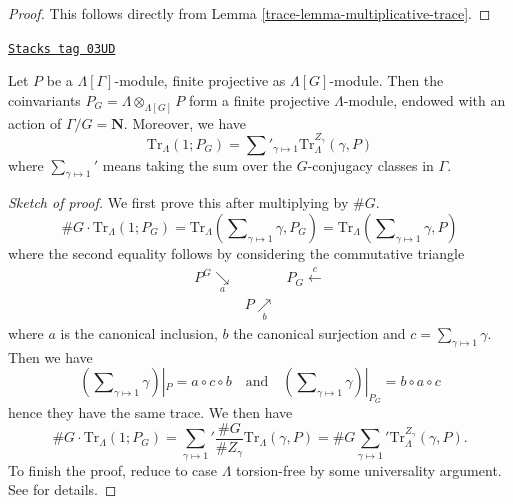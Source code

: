\begin{proof}

This follows directly from Lemma \ref{trace-lemma-multiplicative-trace}.
\end{proof}

\begin{lemma}
\label{trace-lemma-trivial-trace}
\href{https://stacks.math.columbia.edu/tag/03UD}{\texttt{Stacks tag 03UD}}

Let $P$ be a $\Lambda[\Gamma]$-module, finite projective as
$\Lambda[G]$-module. Then the coinvariants
$P_G = \Lambda \otimes_{\Lambda[G]} P$
form a finite projective $\Lambda$-module, endowed with an action of
$\Gamma/G = \mathbf{N}$. Moreover, we have
$$
\text{Tr}_\Lambda(1; P_G) =
\sum\nolimits'_{\gamma \mapsto 1} \text{Tr}_\Lambda^{Z_\gamma}(\gamma, P)
$$
where $\sum_{\gamma\mapsto 1}'$ means taking the sum over the $G$-conjugacy
classes in $\Gamma$.
\end{lemma}

\begin{proof}[Sketch of proof]
We first prove this after multiplying by $\# G$.
$$
\# G\cdot \text{Tr}_\Lambda(1; P_G)
= \text{Tr}_\Lambda(\sum\nolimits_{\gamma\mapsto 1} \gamma, P_G)
= \text{Tr}_\Lambda(\sum\nolimits_{\gamma\mapsto 1} \gamma, P)
$$
where the second equality follows by considering the commutative triangle
$$
\begin{array}{ccc}P^G \underset{a}{\searrow} &  & P_G \overset{c}{\longleftarrow} \\  & P \underset{b}{\nearrow} & \end{array}
$$
where $a$ is the canonical inclusion, $b$ the canonical surjection and $c =
\sum_{\gamma \mapsto 1} \gamma$. Then we have
$$
(\sum\nolimits_{\gamma \mapsto 1} \gamma) |_P = a \circ c \circ b
\quad\text{and}\quad
(\sum\nolimits_{\gamma \mapsto 1} \gamma) |_{P_G} = b \circ a \circ c
$$
hence they have the same trace. We then have
$$
\# G\cdot \text{Tr}_\Lambda(1; P_G)
=
{\sum_{\gamma\mapsto 1}}'
\frac{\# G}{\# Z_\gamma}\text{Tr}_\Lambda(\gamma, P)
= \# G{\sum_{\gamma\mapsto 1}}' \text{Tr}_\Lambda^{Z_\gamma}(\gamma, P).
$$
To finish the proof, reduce to case $\Lambda$ torsion-free by some universality
argument. See \cite{SGA4.5} for details.
\end{proof}

